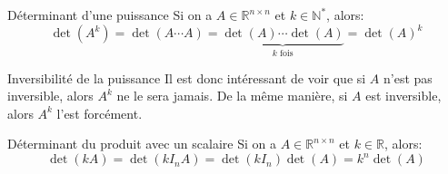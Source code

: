\documentclass[a4paper]{article}
\begin{document}
\begin{parag}{Déterminant d'une puissance}
    Si on a $A \in \mathbb{R}^{n \times n}$ et $k \in \mathbb{N}^*$, alors:
    \[\det\left(A^{k}\right) = \det\left(A \cdots A\right) = \underbrace{\det\left(A\right)\cdots \det\left(A\right)}_{k \text{ fois}} = \det\left(A\right)^k\]

    \begin{subparag}{Inversibilité de la puissance}
        Il est donc intéressant de voir que si $A$ n'est pas inversible, alors $A^{k}$ ne le sera jamais. De la même manière, si $A$ est inversible, alors $A^{k}$ l'est forcément.
    \end{subparag}

\end{parag}

\begin{parag}{Déterminant du produit avec un scalaire}
    Si on a $A \in \mathbb{R}^{n\times n}$ et $k \in \mathbb{R}$, alors:
    \[\det\left(kA\right) = \det\left(kI_n A\right) = \det\left(k I_n\right) \det\left(A\right) = k^{n}\det\left(A\right)\]

\end{parag}
\end{document}
